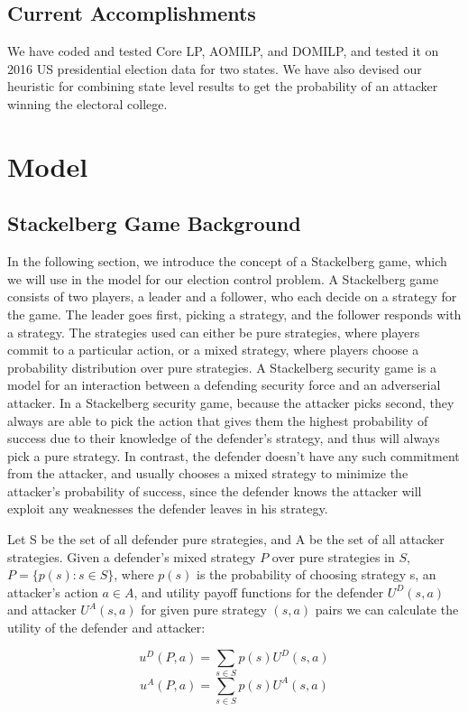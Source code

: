\documentclass[letterpaper]{article} %
\begin{document}
\subsection{Current Accomplishments}
We have coded and tested Core LP, AOMILP, and DOMILP, and tested it on 2016 US presidential election data for two states. We have also devised our heuristic for combining state level results to get the probability of an attacker winning the electoral college. 

\section{Model}
\subsection{Stackelberg Game Background}
In the following section, we introduce the concept of a Stackelberg game, which we will use in the model for our election control problem. A Stackelberg game consists of two players, a leader and a follower, who each decide on a strategy for the game. The leader goes first, picking a strategy, and the follower responds with a strategy. The strategies used can either be pure strategies, where players commit to a particular action, or a mixed strategy, where players choose a probability distribution over pure strategies. A Stackelberg security game is a model for an interaction between a defending security force and an adverserial attacker. In a Stackelberg security game, because the attacker picks second, they always are able to pick the action that gives them the highest probability of success due to their knowledge of the defender's strategy, and thus will always pick a pure strategy. In contrast, the defender doesn't have any such commitment from the attacker, and usually chooses a mixed strategy to minimize the attacker's probability of success, since the defender knows the attacker will exploit any weaknesses the defender leaves in his strategy. 

Let S be the set of all defender pure strategies, and A be the set of all attacker strategies. Given a defender's mixed strategy $P$ over pure strategies in $S$, $P = \{p(s) : s \in S\}$, where $p(s)$ is the probability of choosing strategy s, an attacker's action $a \in A$, and utility payoff functions for the defender $U^D(s,a)$ and attacker $U^A(s,a)$ for given pure strategy $(s,a)$ pairs we can calculate the utility of the defender and attacker:

\begin{equation}
u^D(P,a) = \sum_{s \in S}p(s)U^D(s,a)
\end{equation}
\begin{equation}
u^A(P,a) = \sum_{s \in S}p(s)U^A(s,a)
\end{equation}
\end{document}
